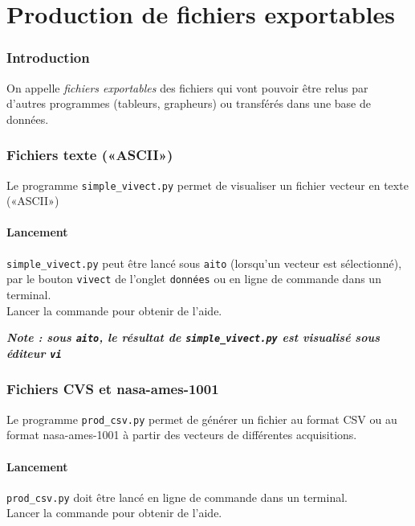 \part{Production de fichiers exportables}
\label{part:ecriture}
\section{Introduction}
On appelle \textit{fichiers exportables} des fichiers qui vont pouvoir être
relus par d'autres programmes (tableurs, grapheurs) ou transférés dans une
base de données.

\section{Fichiers texte («ASCII»)}
Le programme \texttt{simple\_vivect.py} permet de visualiser un fichier
vecteur en texte («ASCII»)

\subsection{Lancement}
\texttt{simple\_vivect.py} peut être lancé sous \texttt{aito} (lorsqu'un
vecteur est sélectionné), par le bouton \texttt{vivect} de l'onglet
\texttt{données} ou en ligne de commande dans un terminal. \\
Lancer la commande  pour obtenir de l'aide.

\medbreak
\textbf{\textit{Note : sous \texttt{aito}, le résultat de
\texttt{simple\_vivect.py} est visualisé sous  éditeur \texttt{vi}}}




\section{Fichiers CVS et nasa-ames-1001}
Le programme \texttt{prod\_csv.py} permet de générer un fichier au format CSV
ou au format nasa-ames-1001 à partir des vecteurs de différentes acquisitions.

\subsection{Lancement}
\texttt{prod\_csv.py} doit être lancé en ligne de commande dans un terminal. \\
Lancer la commande  pour obtenir de l'aide.




